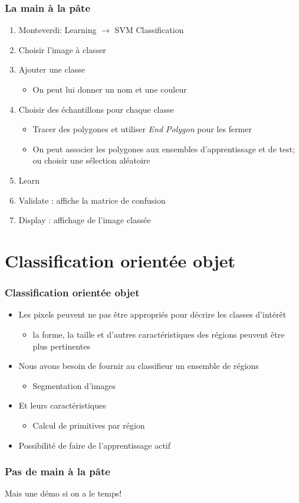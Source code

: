 \documentclass[compress,handout]{beamer}
\begin{document}
\begin{frame}
  \frametitle{La main à la pâte}
  \begin{enumerate}
  \item Monteverdi: Learning $\rightarrow$ SVM Classification
  \item Choisir l'image à classer
  \item Ajouter une classe
    \begin{itemize}
    \item On peut lui donner un nom et une couleur
    \end{itemize}
  \item Choisir des échantillons pour chaque classe
    \begin{itemize}
    \item Tracer des polygones et utiliser {\em End Polygon} pour les fermer
    \item On peut associer les polygones aux ensembles d'apprentissage
      et de test; ou choisir une sélection aléatoire
    \end{itemize}
  \item Learn
  \item Validate : affiche la matrice de confusion
  \item Display : affichage de l'image classée
  \end{enumerate}    
\end{frame}

\section[Orienté objet]{Classification orientée objet}
\label{sec:objectoriented}
\begin{frame}
  \frametitle{Classification orientée objet}
  \begin{itemize}
  \item Les pixels peuvent ne pas être appropriés pour décrire les
    classes d'intérêt
    \begin{itemize}
    \item la forme, la taille et d'autres caractéristiques des régions
      peuvent être plus pertinentes
    \end{itemize}
  \item Nous avons besoin de fournir au classifieur un ensemble de régions
    \begin{itemize}
    \item Segmentation d'images
    \end{itemize}
  \item Et leurs caractéristiques
    \begin{itemize}
    \item Calcul de primitives par région
    \end{itemize}
  \item Possibilité de faire de l'apprentissage actif
  \end{itemize}
\end{frame}

\begin{frame}
  \frametitle{Pas de main à la pâte}
Mais une démo si on a le temps!
\end{frame}
\end{document}
